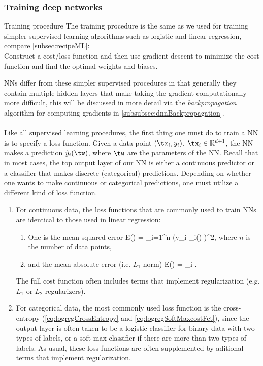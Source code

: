 \subsubsection{Training deep networks}
\label{subsubsec:dnnTraining}
\begin{mybox}{Training procedure}
	The training procedure is the same as we used for training simpler supervised learning algorithms such as logistic and linear regression, compare \ref{subsec:recipeML}:\\
	Construct a cost/loss function and then use gradient descent to minimize the cost function and find the optimal weights and biases. 
\end{mybox}
NNs differ from these simpler supervised procedures in that generally they contain multiple hidden layers that make taking the gradient computationally more difficult, this will be discussed in more detail via the \emph{backpropagation} algorithm for computing gradients in \ref{subsubsec:dnnBackpropagation}.\\
\\
Like all supervised learning procedures, the first thing one must do to train a NN is to specify a loss function. Given a data point $(\tx_i,y_i)$, $\tx_i \in \mR^{d+1}$, the NN makes a prediction $\hat{y}_i(\tw)$, where $\tw$ are the parameters of the NN. Recall that in most cases, the top output layer of our NN is either a continuous predictor or a classifier that makes discrete (categorical) predictions. Depending on whether one wants to make continuous or categorical predictions, one must utilize a different kind of loss function.
\begin{enumerate} 
\item For continuous data, the loss functions that are commonly used to train NNs are identical to those used in linear regression:
\begin{enumerate}
	\item One is the mean squared error
	\be 
	\label{eq:dnnCostSquaredError}
	E(\tw) = \sum_{i=1}^n (y_i-_i(\tw) )^2, 
	\ee 
	where $n$ is the number of data points,
	\item and the mean-absolute error (i.e. $L_1$ norm) 
	\be 
	\label{eq:dnnCostAbsoluteError} 
	E(\tw) =  \sum_i .
		\ee 
\end{enumerate}
The full cost function often includes terms that implement regularization (e.g. $L_1$ or $L_2$ regularizers).
\item For categorical data, the most commonly used loss function is the cross-entropy (\ref{eq:logregCrossEntropy} and \ref{eq:logregSoftMaxcostFct}), since the output layer is often taken to be a logistic classifier for binary data with two types of labels, or a soft-max classifier if there are more than two types of labels. As usual, these loss functions are often supplemented by aditional terms that implement regularization.
\end{enumerate}
